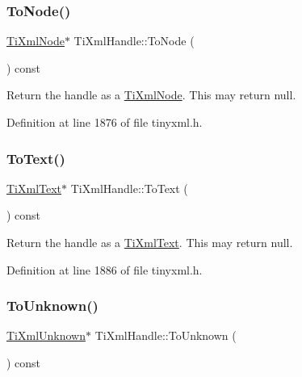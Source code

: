 \hypertarget{class_ti_xml_handle_a0e436dea2dd869a859e3a4486023f0fa}{}\label{class_ti_xml_handle_a0e436dea2dd869a859e3a4486023f0fa} 
\subsubsection{\texorpdfstring{To\+Node()}{ToNode()}}
{\footnotesize\ttfamily \hyperlink{class_ti_xml_node}{Ti\+Xml\+Node}$\ast$ Ti\+Xml\+Handle\+::\+To\+Node (\begin{DoxyParamCaption}{ }\end{DoxyParamCaption}) const\hspace{0.3cm}{\ttfamily [inline]}}

Return the handle as a \hyperlink{class_ti_xml_node}{Ti\+Xml\+Node}. This may return null. 

Definition at line 1876 of file tinyxml.\+h.

\hypertarget{class_ti_xml_handle_abde286bce1d5db0d20ec30e573278cdf}{}\label{class_ti_xml_handle_abde286bce1d5db0d20ec30e573278cdf} 
\subsubsection{\texorpdfstring{To\+Text()}{ToText()}}
{\footnotesize\ttfamily \hyperlink{class_ti_xml_text}{Ti\+Xml\+Text}$\ast$ Ti\+Xml\+Handle\+::\+To\+Text (\begin{DoxyParamCaption}{ }\end{DoxyParamCaption}) const\hspace{0.3cm}{\ttfamily [inline]}}

Return the handle as a \hyperlink{class_ti_xml_text}{Ti\+Xml\+Text}. This may return null. 

Definition at line 1886 of file tinyxml.\+h.

\hypertarget{class_ti_xml_handle_a450ec91dac1ded02d72eb918d062ad31}{}\label{class_ti_xml_handle_a450ec91dac1ded02d72eb918d062ad31} 
\subsubsection{\texorpdfstring{To\+Unknown()}{ToUnknown()}}
{\footnotesize\ttfamily \hyperlink{class_ti_xml_unknown}{Ti\+Xml\+Unknown}$\ast$ Ti\+Xml\+Handle\+::\+To\+Unknown (\begin{DoxyParamCaption}{ }\end{DoxyParamCaption}) const\hspace{0.3cm}{\ttfamily [inline]}}


